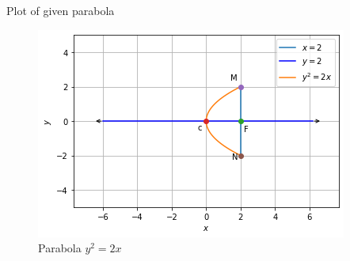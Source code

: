\documentclass[journal,12pt,twocolumn]{IEEEtran}
\begin{document}
Plot of given parabola
\begin{figure}[!ht]
\centering
\includegraphics[width=\columnwidth]{Figure 6.png}
\caption{Parabola $y^2=2x$ }
\label{fig:parabola}	
\end{figure}
\end{document}
